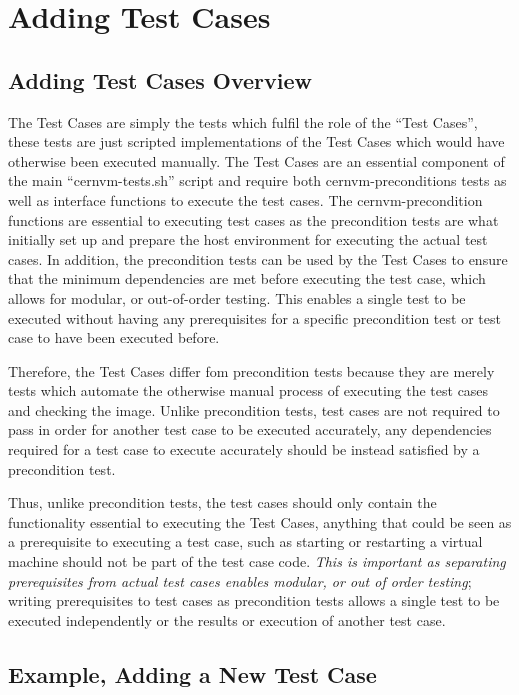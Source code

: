 \chapter{Adding \cernvm Test Cases}
\section{Adding Test Cases Overview}
\label{sec:addtestsoverview}

The \cernvm Test Cases are simply the tests which fulfil the role of the ``\cernvm Test Cases'', these tests are just scripted
implementations of the \cernvm Test Cases which would have otherwise been executed manually. The \cernvm Test Cases
are an essential component of the main ``cernvm-tests.sh'' script and require both cernvm-preconditions tests as well as
interface functions to execute the test cases. The cernvm-precondition functions are essential to executing test cases as the 
precondition tests are what initially set up and prepare the host environment for executing the actual test cases. In addition,
the precondition tests can be used by the \cernvm Test Cases to ensure that the minimum dependencies are met before
executing the test case, which allows for modular, or out-of-order testing. This enables a single test to be executed without
having any prerequisites for a specific precondition test or test case to have been executed before.

Therefore, the \cernvm Test Cases differ fom precondition tests because they are merely tests which automate the otherwise
manual process of executing the test cases and checking the \cernvm image. Unlike precondition tests, test cases are not required to
pass in order for another \cernvm test case to be executed accurately, any dependencies required for a test case to execute
accurately should be instead satisfied by a precondition test. 

Thus, unlike precondition tests, the test cases should only contain the functionality essential to executing the \cernvm Test Cases,
anything that could be seen as a prerequisite to executing a test case, such as starting or restarting a virtual machine should
not be part of the test case code. \emph{This is important as separating prerequisites from actual test cases enables modular,
or out of order testing}; writing prerequisites to test cases as precondition tests allows a single test to be executed independently
or the results or execution of another test case.


\section{Example, Adding a New Test Case}
\label{sec:addnewtest}

